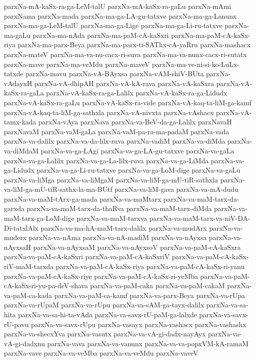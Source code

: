 {parxNa-mA-kaSx-ra-ga-LeM-talU
parxNa-mA-kaSx-ra-gaLu
parxNa-mAmi
parxNama
parxNa-mada
parxNa-ma-ga-LA-gu-tatxve
parxNa-ma-ga-Lanunx
parxNa-ma-ga-LeM-talU
parxNa-ma-ga-Lige
parxNa-ma-ga-Li-ru-tatxve
parxNa-ma-gaLu
parxNa-ma-nAda
parxNa-ma-paM-cA-kaSxri
parxNa-ma-paM-cA-kaSx-riya
parxNa-ma-parx-Beya
parxNa-ma-parx-ti-SAThx-cA-yaRru
parxNa-mashacx
parxNa-mateV
parxNa-ma-va-nu-cacx-ri-suva
parxNa-ma-va-nunx-cacx-ri-sutatx
parxNa-mave
parxNa-ma-veMdu
parxNa-maveV
parxNa-ma-ve-ni-si-ko-LuLx-tatxde
parxNa-mavu
parxNa-vA-BAyxsa
parxNa-vAM-shiV-BUta
parxNa-vAdayxH
parxNa-vA-dhipAH
parxNa-vA-kA-rava
parxNa-vA-kaSxra
parxNa-vA-kaSx-ra-gaLa
parxNa-vA-kaSx-ra-ga-Lalilx
parxNa-vA-kaSx-ra-ga-Lidudx
parxNa-vA-kaSx-ra-gaLu
parxNa-vA-kaSx-ra-vide
parxNa-vA-kaq-ta-liM-ga-kamf
parxNa-vA-kaq-ta-liM-ga-sathxla
parxNa-vA-nivxta
parxNa-vAshacx
parxNa-vA-tamx-kada
parxNa-vAya
parxNava
parxNa-va-BeV-da-ga-Lalilx
parxNavaH
parxNavaM
parxNa-vaM-gaLa
parxNa-vaM-pa-ra-ma-padaM
parxNa-vada
parxNa-va-dalilx
parxNa-va-da-lilx-ruva
parxNa-vadiM
parxNa-va-diMda
parxNa-va-diMdaM
parxNa-va-ga-LAgi
parxNa-va-ga-LA-gu-tatxve
parxNa-va-gaLa
parxNa-va-ga-Lalilx
parxNa-va-ga-La-lilx-ruva
parxNa-va-ga-LiMda
parxNa-va-ga-Lidudx
parxNa-va-ga-Li-ru-tatxve
parxNa-va-ga-LoM-dige
parxNa-va-gaLu
parxNa-va-liMga
parxNa-va-liMgaM
parxNa-va-liM-ga-mU-tiR-sathxla
parxNa-va-liM-ga-mU-tiR-sathx-la-ma-BUtf
parxNa-va-liM-gava
parxNa-va-mA-dudu
parxNa-va-maM-tArx-ga-mada
parxNa-va-maMtarx
parxNa-va-maM-tarx-da-garxda
parxNa-va-maM-tarx-da-thaRva
parxNa-va-maM-tarx-diMda
parxNa-va-maM-tarx-ga-LoM-dige
parxNa-va-maM-tarxva
parxNa-va-maM-tarx-va-niV-DA-Di-tatxlAlx
parxNa-va-ma-hA-maM-tarx-dalilx
parxNa-va-mudArx
parxNa-va-muderx
parxNa-va-nAma
parxNa-va-nA-madiM
parxNa-va-nAyxsa
parxNa-va-nAyxsaH
parxNa-va-nAyxsaM
parxNa-va-nAyxsoV
parxNa-va-paM-cA-kaSxra
parxNa-va-paM-cA-kaSxri
parxNa-va-paM-cA-kaSxriV
parxNa-va-paM-cA-kaSx-riV-maM-tarxda
parxNa-va-paM-cA-kaSx-riya
parxNa-va-paM-cA-kaSx-ri-yanu
parxNa-va-paM-cA-kaSx-riye
parxNa-va-paM-cA-kaSx-ri-yeMba
parxNa-va-paM-cA-kaSx-ri-yu-pa-deV-shava
parxNa-va-paM-caka
parxNa-va-paM-cakaM
parxNa-va-paM-ca-kada
parxNa-va-paM-ca-kamf
parxNa-va-parx-Beya
parxNa-va-rUpa
parxNa-va-rUpaM
parxNa-va-rUpu
parxNa-va-sAM-ga-tayx-dalilx
parxNa-va-sa-hita
parxNa-va-sa-hi-ta-vAda
parxNa-va-savx-rU-paM-ga-lalxde
parxNa-va-savx-rU-pavu
parxNa-va-savx-rUpu
parxNa-vasayx
parxNa-vashacx
parxNa-vashashx
parxNa-va-shecxYva
parxNa-vasutx
parxNa-va-vA-gi-dadx-nayAyx
parxNa-va-vA-gi-dadxnu
parxNa-vava
parxNa-va-vanunx
parxNa-va-va-popxVM-kA-ramaM
parxNa-vave
parxNa-va-veMba
parxNa-va-veMdu
parxNa-vaveV
}
